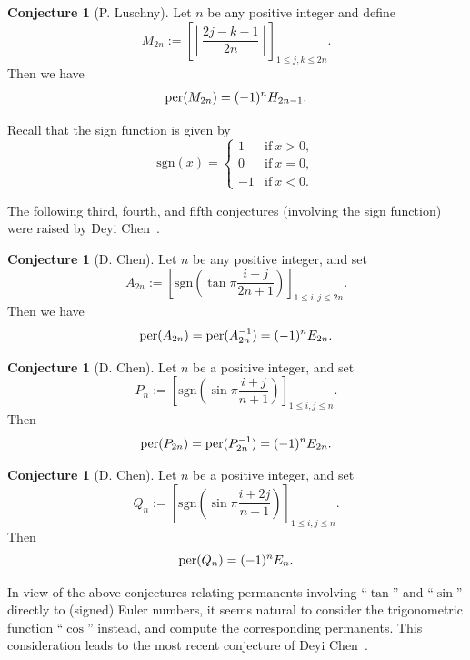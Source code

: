 \documentclass[11pt,reqno]{amsart}
\numberwithin{equation}{section}
\theoremstyle{plain}
\theoremstyle{definition}
\newtheorem{conj}[theorem]{Conjecture}
\def\per{\mathrm{per}}
\def\sgn{\mathrm{sgn}}
\def\l{\left}
\def\r{\right}
\def\t{\text}
\def\per{{\rm per}}
\begin{document}
\begin{conj}[P. Luschny]\label{conj:Lus} Let $n$ be any positive integer and define
$$M_{2n}:=\left[\left\lfloor\frac{2j-k-1}{2n}\right\rfloor\right]_{1\le j,k\le 2n}.$$
 Then we have
\begin{align}
\per(M_{2n})=(-1)^nH_{2n-1}.
\end{align}
\end{conj}

Recall that the sign function is given by
$$\sgn(x)=\begin{cases}
1&\t{if}\ x>0,\\
0&\t{if}\ x=0,\\-1&\t{if}\ x<0.
\end{cases}$$

The following third, fourth, and fifth conjectures (involving the sign function) were
raised by Deyi Chen~\cite{Che1,Che2}.

\begin{conj}[D. Chen]\label{conj:ChenA} Let $n$ be any positive integer, and set
$$A_{2n}:=\l[\sgn\l(\tan\pi\frac{i+j}{2n+1}\r)\r]_{1\le i,j\le 2n}.$$
Then we have
\begin{align}
\per(A_{2n})=\per(A^{-1}_{2n})=(-1)^nE_{2n}.
\end{align}
\end{conj}

\begin{conj}[D. Chen]\label{conj:Chen} Let $n$ be a positive integer, and set
$$P_n:=\left[\sgn\left(\sin\pi\frac{i+j}{n+1}\right)\right]_{1\le i,j\le n}.$$
Then
\begin{equation}\label{P2n}
\per(P_{2n})=\per(P^{-1}_{2n})=(-1)^nE_{2n}.
\end{equation}
\end{conj}

\begin{conj}[D. Chen]\label{conj:Chen2}
Let $n$ be a positive integer, and set
 $$Q_n:=\left[\sgn\left(\sin\pi\frac{i+2j}{n+1}\right)\right]_{1\le i,j\le n}.$$  Then
\begin{equation}
\per(Q_n)=(-1)^nE_{n}.
\end{equation}
\end{conj}

In view of the above conjectures relating permanents involving ``$\tan$'' and ``$\sin$'' directly to (signed) Euler numbers, it seems natural to consider the trigonometric function ``$\cos$'' instead, and compute the corresponding permanents. This consideration leads to the most recent conjecture of Deyi Chen~\cite{Che3}.
\end{document}
